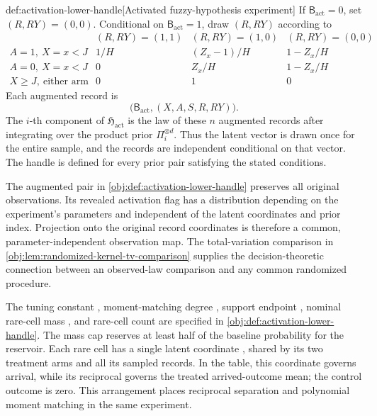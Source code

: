 \begin{algorithmv}{def:activation-lower-handle}[Activated fuzzy-hypothesis experiment]
If \(\mathsf B_{\mathrm{act}}=0\), set \((R,RY)=(0,0)\). Conditional on \(\mathsf B_{\mathrm{act}}=1\), draw \((R,RY)\) according to
\[
\begin{array}{c|ccc}
 & (R,RY)=(1,1) & (R,RY)=(1,0) & (R,RY)=(0,0)\\ \hline
 A=1,\ X=x<J & 1/H & (Z_x-1)/H & 1-Z_x/H\\
 A=0,\ X=x<J & 0 & Z_x/H & 1-Z_x/H\\
 X\ge J,\ \text{either arm} & 0 & 1 & 0
\end{array}
\]
Each augmented record is
\[
\bigl(\mathsf B_{\mathrm{act}},(X,A,S,R,RY)\bigr).
\]
The \(i\)-th component of \(\mathfrak H_{\mathrm{act}}\) is the law of these \(n\) augmented records after integrating over the product prior \(\Pi_i^{\otimes d}\). Thus the latent vector is drawn once for the entire sample, and the records are independent conditional on that vector. The handle is defined for every prior pair satisfying the stated conditions.
\end{algorithmv}

The augmented pair  in \cref{obj:def:activation-lower-handle} preserves all original observations. Its revealed activation flag  has a distribution depending on the experiment's parameters and independent of the latent coordinates and prior index. Projection onto the original record coordinates is therefore a common, parameter-independent observation map. The total-variation comparison in \cref{obj:lem:randomized-kernel-tv-comparison} supplies the decision-theoretic connection between an observed-law comparison and any common randomized procedure.

The tuning constant , moment-matching degree , support endpoint , nominal rare-cell mass , and rare-cell count  are specified in \cref{obj:def:activation-lower-handle}. The mass cap reserves at least half of the baseline probability for the reservoir. Each rare cell has a single latent coordinate , shared by its two treatment arms and all its sampled records. In the table, this coordinate governs arrival, while its reciprocal governs the treated arrived-outcome mean; the control outcome is zero. This arrangement places reciprocal separation and polynomial moment matching in the same experiment.

